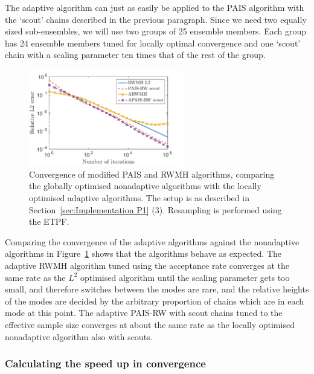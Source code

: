 \documentclass[final]{siamltex}
\begin{document}
The adaptive algorithm can just as easily be applied to the PAIS
algorithm with the `scout' chains described in the previous paragraph.
Since we need two equally sized sub-ensembles, we will use two groups
of 25 ensemble members. Each group has 24 ensemble members tuned for
locally optimal convergence and one `scout' chain with a scaling
parameter ten times that of the rest of the group.

\begin{figure}[htb]
\begin{center}
\includegraphics[width=0.6\textwidth]{"figures/BM2_AL2"}
\caption{Convergence of modified PAIS and RWMH algorithms, comparing
the globally optimised nonadaptive algorithms with the locally
optimised adaptive algorithms. The setup is as described in
Section~\ref{sec:Implementation P1} (3). Resampling is performed using
the ETPF.}
\label{fig:BM2_AL2}
\end{center}
\end{figure}

Comparing the convergence of the adaptive algorithms against the
nonadaptive algorithms in Figure~\ref{fig:BM2_AL2} shows that the
algorithms behave as expected. The adaptive RWMH algorithm tuned using
the acceptance rate converges at the same rate as the $L^2$ optimised
algorithm until the scaling parameter gets too small, and therefore
switches between the modes are rare, and the relative heights of the
modes are decided by the arbitrary proportion of chains which are in
each mode at this point. The adaptive PAIS-RW with scout chains tuned
to the effective sample size converges at about the same rate as the
locally optimised nonadaptive algorithm also with scouts.


\subsubsection{Calculating the speed up in convergence}
\label{sec:calc_saving}
\end{document}
